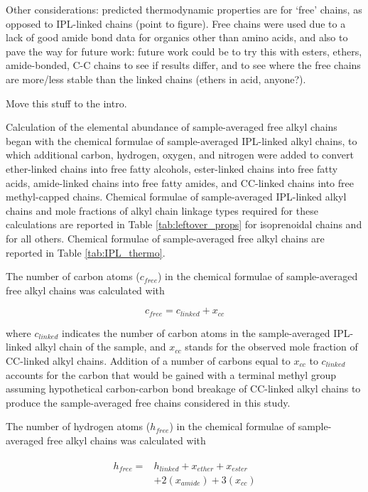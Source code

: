 Other considerations: predicted thermodynamic properties are for `free' chains, as opposed to IPL-linked chains (point to figure). Free chains were used due to a lack of good amide bond data for organics other than amino acids, and also to pave the way for future work: future work could be to try this with esters, ethers, amide-bonded, C-C chains to see if results differ, and to see where the free chains are more/less stable than the linked chains (ethers in acid, anyone?).

Move this stuff to the intro.


Calculation of the elemental abundance of sample-averaged free alkyl chains began with the chemical formulae of sample-averaged IPL-linked alkyl chains, to which additional carbon, hydrogen, oxygen, and nitrogen were added to convert ether-linked chains into free fatty alcohols, ester-linked chains into free fatty acids, amide-linked chains into free fatty amides, and CC-linked chains into free methyl-capped chains. Chemical formulae of sample-averaged IPL-linked alkyl chains and mole fractions of alkyl chain linkage types required for these calculations are reported in Table \ref{tab:leftover_props} for isoprenoidal chains and \cite{boyer2018thermophile} for all others. Chemical formulae of sample-averaged free alkyl chains are reported in Table \ref{tab:IPL_thermo}.

The number of carbon atoms ($c_{free}$) in the chemical formulae of sample-averaged free alkyl chains was calculated with

\begin{equation}
    c_{free} = c_{linked} + x_{cc}
\end{equation}

\noindent where $c_{linked}$ indicates the number of carbon atoms in the sample-averaged IPL-linked alkyl chain of the sample, and $x_{cc}$ stands for the observed mole fraction of CC-linked alkyl chains. Addition of a number of carbons equal to $x_{cc}$ to $c_{linked}$ accounts for the carbon that would be gained with a terminal methyl group assuming hypothetical carbon-carbon bond breakage of CC-linked alkyl chains to produce the sample-averaged free chains considered in this study.

The number of hydrogen atoms ($h_{free}$) in the chemical formulae of sample-averaged free alkyl chains was calculated with

\begin{align}
\begin{split}
    h_{free} = &h_{linked} + x_{ether} + x_{ester}\\
        & + 2(x_{amide}) + 3(x_{cc}) \\
\end{split}
\end{align}

